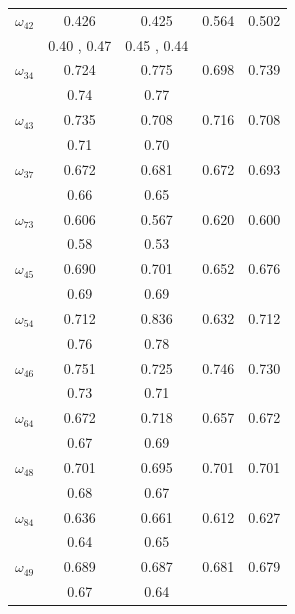\documentclass[preprint,12pt]{elsarticle}
\begin{document}
\begin{table}[!ht]
\begin{tabular}{|c|c|c|c|c|}
       \hline
       $\omega_{42}$  &0.426 &0.425 &0.564 &0.502 \\
       &0.40 \cite{yang_significant_2023}, 0.47 \cite{ke2025diffusion} & 0.45 \cite{yang_significant_2023}, 0.44 \cite{ke2025diffusion}&&\\
       \hline
       $\omega_{34}$  &0.724 &0.775 &0.698 &0.739 \\ 
       &0.74 \cite{ke2025diffusion}& 0.77 \cite{ke2025diffusion}&&\\
       \hline
       $\omega_{43}$  &0.735 &0.708 &0.716 &0.708 \\
       &0.71 \cite{ke2025diffusion}& 0.70 \cite{ke2025diffusion}&&\\
       \hline
       $\omega_{37}$ &0.672 &0.681 &0.672 &0.693 \\
       &0.66 \cite{ke2025diffusion}& 0.65 \cite{ke2025diffusion}&&\\
       \hline
       $\omega_{73}$  &0.606 &0.567 &0.620 &0.600 \\
       &0.58 \cite{ke2025diffusion} & 0.53 \cite{ke2025diffusion}&&\\
       \hline
       $\omega_{45}$ &0.690 &0.701 &0.652 &0.676 \\ 
       &0.69 \cite{ke2025diffusion} & 0.69 \cite{ke2025diffusion}&&\\
       \hline
       $\omega_{54}$ &0.712 &0.836 &0.632 &0.712 \\
       &0.76 \cite{ke2025diffusion}& 0.78 \cite{ke2025diffusion}&& \\
       \hline
       $\omega_{46}$ &0.751 &0.725 &0.746 &0.730 \\
       &0.73 \cite{ke2025diffusion} & 0.71 \cite{ke2025diffusion}&&\\
       \hline
       $\omega_{64}$ &0.672 &0.718 &0.657 &0.672 \\
       &0.67 \cite{ke2025diffusion}& 0.69 \cite{ke2025diffusion}&&\\
       \hline
       $\omega_{48}$ &0.701 &0.695 &0.701 &0.701 \\ 
       & 0.68 \cite{ke2025diffusion}& 0.67 \cite{ke2025diffusion}&&\\
       \hline
       $\omega_{84}$  &0.636 &0.661 &0.612 &0.627 \\
       & 0.64 \cite{ke2025diffusion}& 0.65 \cite{ke2025diffusion}&&\\
       \hline
       $\omega_{49}$ &0.689 &0.687 &0.681 &0.679 \\ 
       & 0.67 \cite{ke2025diffusion}& 0.64 \cite{ke2025diffusion}&&\\

\end{tabular}
\end{table}
\end{document}
